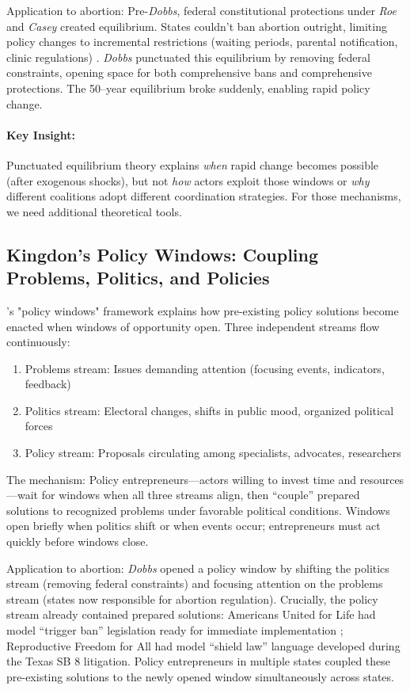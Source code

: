 Application to abortion: Pre-\emph{Dobbs}, federal constitutional protections under \emph{Roe} and \emph{Casey} created equilibrium. States couldn't ban abortion outright, limiting policy changes to incremental restrictions (waiting periods, parental notification, clinic regulations) \parencite{PlannedParenthoodSoutheastern1992}. \emph{Dobbs} punctuated this equilibrium by removing federal constraints, opening space for both comprehensive bans and comprehensive protections. The 50--year equilibrium broke suddenly, enabling rapid policy change.

\paragraph{Key Insight:} Punctuated equilibrium theory explains \emph{when} rapid change becomes possible (after exogenous shocks), but not \emph{how} actors exploit those windows or \emph{why} different coalitions adopt different coordination strategies. For those mechanisms, we need additional theoretical tools.

\subsection{Kingdon's Policy Windows: Coupling Problems, Politics, and Policies}

\textcite{kingdonAgendasAlternativesPublic2011a}'s "policy windows" framework explains how pre-existing policy solutions become enacted when windows of opportunity open. Three independent streams flow continuously:

\begin{enumerate}
\item Problems stream: Issues demanding attention (focusing events, indicators, feedback)
\item Politics stream: Electoral changes, shifts in public mood, organized political forces
\item Policy stream: Proposals circulating among specialists, advocates, researchers
\end{enumerate}

The mechanism: Policy entrepreneurs---actors willing to invest time and resources---wait for windows when all three streams align, then ``couple'' prepared solutions to recognized problems under favorable political conditions. Windows open briefly when politics shift or when events occur; entrepreneurs must act quickly before windows close.

Application to abortion: \emph{Dobbs} opened a policy window by shifting the politics stream (removing federal constraints) and focusing attention on the problems stream (states now responsible for abortion regulation).
Crucially, the policy stream already contained prepared solutions: Americans United for Life had model ``trigger ban'' legislation ready for immediate implementation \parencite{beckerThisAntiabortionGroup2022}; Reproductive Freedom for All had model ``shield law'' language developed during the Texas SB 8 litigation. Policy entrepreneurs in multiple states coupled these pre-existing solutions to the newly opened window simultaneously across states.


